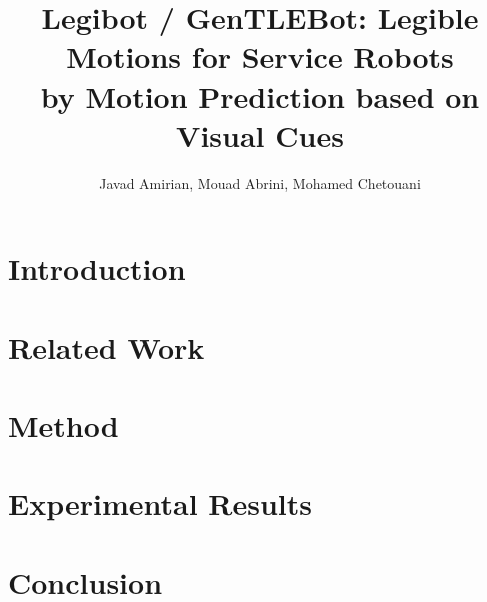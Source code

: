 \documentclass[letterpaper, 10pt, conference]{article}
\begin{document}
\title{Legibot / GenTLEBot: Legible Motions for Service Robots \\ \large by Motion Prediction based on Visual Cues}
\author{Javad Amirian, Mouad Abrini, Mohamed Chetouani}
\maketitle

\begin{abstract}

\end{abstract}



\section{Introduction}


\section{Related Work}


\section{Method}




\section{Experimental Results}


\section{Conclusion}




\end{document}
